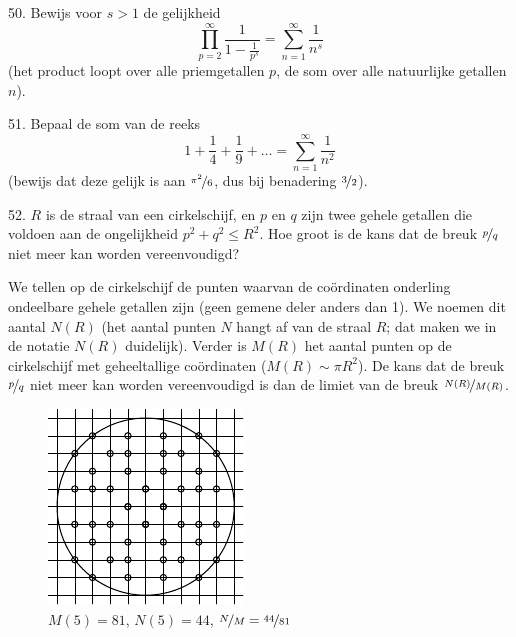\begin{problem}{50.}
	Bewijs voor $s>1$ de gelijkheid
	\begin{equation*}
		\textstyle\prod\limits_{p=2}^{\infty} \frac{1}{1-\frac{1}{p^s}}=\textstyle\sum\limits_{n=1}^{\infty} \frac{1}{n^s}
	\end{equation*}
	(het product loopt over alle priemgetallen $p$, de som over alle natuur\-lijke getallen $n$).
\end{problem}

\begin{problem}{51.}
	Bepaal de som van de reeks
	\begin{equation*}
		1+ \frac{1}{4}+ \frac{1}{9}+\dots=\textstyle\sum\limits_{n=1}^{\infty} \frac{1}{n^2}
	\end{equation*}
	(bewijs dat deze gelijk is aan $\nicefrac{\pi^2}{6}$, dus bij benadering $\nicefrac{3}{2}$).
\end{problem}

\begin{problem}{52.}
	$R$ is de straal van een cirkelschijf, en $p$ en $q$ zijn twee gehele getallen die voldoen aan de ongelijkheid $p^2+q^2 \leqslant R^2$. Hoe groot is de kans dat de breuk $\nicefrac{p}{q}$ niet meer kan worden vereenvoudigd?

	We tellen op de cirkelschijf de punten waarvan de coördinaten onderling ondeelbare gehele getallen zijn (geen gemene deler anders dan 1). We noemen dit aantal $N(R)$ (het aantal punten $N$ hangt af van de straal $R$; dat maken we in de notatie $N(R)$ duidelijk). Verder is $M(R)$ het aantal punten op de cirkelschijf met geheeltallige coördinaten ($M(R) \sim \pi R^2$). De kans dat de breuk $\nicefrac{p}{q}$ niet meer kan worden vereenvoudigd is dan de limiet van de breuk $\nicefrac{N(R)}{M(R)}$.
\\
	\begin{figure}
		\includegraphics{resources/taskbook-36}\\
		\footnotesize $M(5)=81$, $N(5)=44$, $\nicefrac{N}{M} = \nicefrac{44}{81}$
	\end{figure}
\end{problem}

